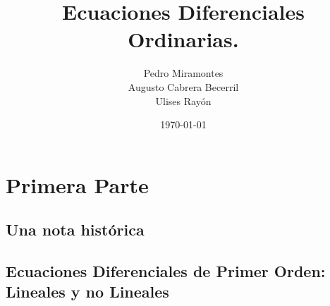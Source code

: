 \documentclass[10pt]{book} %
\title{ Ecuaciones Diferenciales Ordinarias.}
\author{Pedro Miramontes\\ Augusto Cabrera Becerril\\ Ulises Ray\'on}
\date{\today}
\begin{document}
\maketitle





\tableofcontents %


\part{Primera Parte}



\chapter{Una nota hist\'orica}


\chapter{Ecuaciones Diferenciales de Primer Orden:
        Lineales y no Lineales}







%

\end{document}
